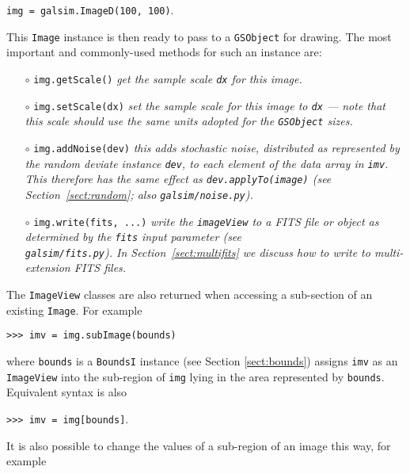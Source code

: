 \documentclass[preprint,11pt]{aastex}
\begin{document}
{\tt img = galsim.ImageD(100, 100)}.

This \texttt{Image} instance is then ready to pass to a
\texttt{GSObject} for drawing.  The most important and commonly-used
methods for such an instance are:
\begin{itemize}

\item[$\circ$] \texttt{img.getScale()} \newline \emph{get the sample
    scale \texttt{dx} for this image.}

\item[$\circ$] \texttt{img.setScale(dx)} \newline \emph{set the sample
    scale for this image to \texttt{dx} --- note that this scale
    should use the same units adopted for the \texttt{GSObject}
    sizes.}

\item[$\circ$] \texttt{img.addNoise(dev)} \newline \emph{this adds
    stochastic noise, distributed as represented by the random deviate
    instance \texttt{dev}, to each element of the data array in
    \texttt{imv}.  This therefore has the same effect as
    \texttt{dev.applyTo(image)} (see Section~\ref{sect:random}; also
    \texttt{galsim/noise.py}).}

\item[$\circ$] \texttt{img.write(fits, ...)}  \newline \emph{write the
    \texttt{imageView} to a FITS file or object as determined by the
    \texttt{fits} input parameter
    (see \\
    \texttt{galsim/fits.py}).  In Section~\ref{sect:multifits} we
    discuss how to write to multi-extension FITS files.}

\end{itemize}

The \texttt{ImageView} classes are also returned when accessing a
sub-section of an existing \texttt{Image}.  For example

{\tt >>> imv = img.subImage(bounds)}

where \texttt{bounds} is a \texttt{BoundsI} instance (see Section
\ref{sect:bounds}) assigns \texttt{imv} as an \texttt{ImageView} into
the sub-region of \texttt{img} lying in the area represented by
\texttt{bounds}.  Equivalent syntax is also

{\tt >>> imv = img[bounds]}.

It is also possible to change the values of a sub-region of an image
this way, for example
\end{document}
